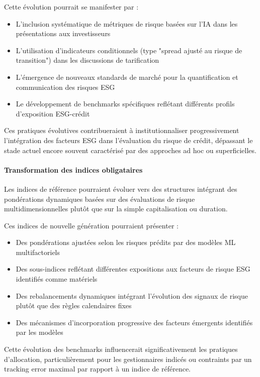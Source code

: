 Cette évolution pourrait se manifester par :
\begin{itemize}
    \item L'inclusion systématique de métriques de risque basées sur l'IA dans les présentations aux investisseurs
    \item L'utilisation d'indicateurs conditionnels (type "spread ajusté au risque de transition") dans les discussions de tarification
    \item L'émergence de nouveaux standards de marché pour la quantification et communication des risques ESG
    \item Le développement de benchmarks spécifiques reflétant différents profils d'exposition ESG-crédit
\end{itemize}

Ces pratiques évolutives contribueraient à institutionnaliser progressivement l'intégration des facteurs ESG dans l'évaluation du risque de crédit, dépassant le stade actuel encore souvent caractérisé par des approches ad hoc ou superficielles.

\paragraph{Transformation des indices obligataires} 
Les indices de référence pourraient évoluer vers des structures intégrant des pondérations dynamiques basées sur des évaluations de risque multidimensionnelles plutôt que sur la simple capitalisation ou duration.

Ces indices de nouvelle génération pourraient présenter :
\begin{itemize}
    \item Des pondérations ajustées selon les risques prédits par des modèles ML multifactoriels
    \item Des sous-indices reflétant différentes expositions aux facteurs de risque ESG identifiés comme matériels
    \item Des rebalancements dynamiques intégrant l'évolution des signaux de risque plutôt que des règles calendaires fixes
    \item Des mécanismes d'incorporation progressive des facteurs émergents identifiés par les modèles
\end{itemize}

Cette évolution des benchmarks influencerait significativement les pratiques d'allocation, particulièrement pour les gestionnaires indicés ou contraints par un tracking error maximal par rapport à un indice de référence.

